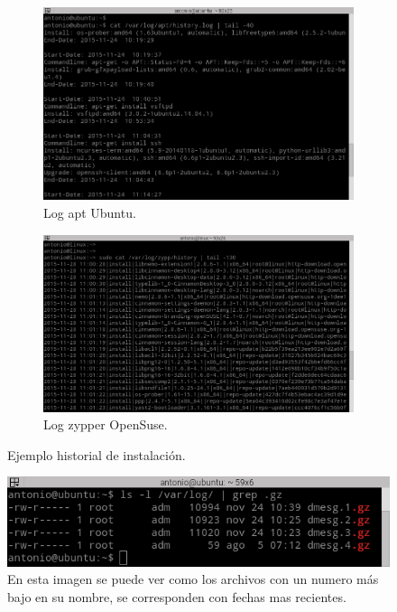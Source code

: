 \begin{figure}[H]
    \centering
    \begin{subfigure}[b]{0.5\textwidth}
        \includegraphics[width=\textwidth]{imagenes/logu}
        \caption{Log apt Ubuntu.}
    \end{subfigure}
    \begin{subfigure}[b]{0.5\textwidth}
        \includegraphics[width=\textwidth]{imagenes/logs}
        \caption{Log zypper OpenSuse.}
    \end{subfigure}
    \caption{Ejemplo historial de instalación.}
    \label{fig16}
\end{figure}

\begin{figure}[H]
  \begin{center}
    \includegraphics[width=1\textwidth]{imagenes/rot}
    \caption{En esta imagen se puede ver como los archivos con un numero más bajo en su nombre, se corresponden con fechas mas recientes.}
    \label{fig17}
  \end{center}
\end{figure}

